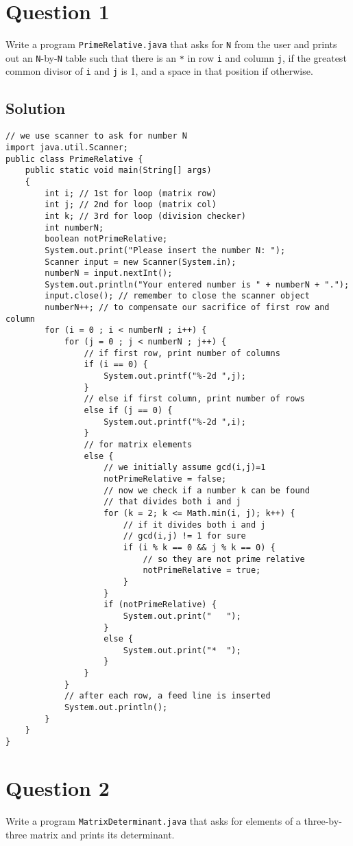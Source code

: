 \section*{Question 1}
Write a program \texttt{PrimeRelative.java} that asks for \texttt{N} from the user and prints out an \texttt{N}-by-\texttt{N} table such that there is an \texttt{*} in row \texttt{i} and column \texttt{j}, if the greatest common divisor of \texttt{i} and \texttt{j} is 1, and a space in that position if otherwise.

\subsection*{Solution}
\lstset{language=Java,tabsize=2}
\begin{lstlisting}
// we use scanner to ask for number N
import java.util.Scanner;
public class PrimeRelative {
	public static void main(String[] args) 
	{
		int i; // 1st for loop (matrix row)
		int j; // 2nd for loop (matrix col)
		int k; // 3rd for loop (division checker)
		int numberN;
		boolean notPrimeRelative;
		System.out.print("Please insert the number N: ");
		Scanner input = new Scanner(System.in);
		numberN = input.nextInt();
		System.out.println("Your entered number is " + numberN + ".");
		input.close(); // remember to close the scanner object
		numberN++; // to compensate our sacrifice of first row and column
		for (i = 0 ; i < numberN ; i++) {
			for (j = 0 ; j < numberN ; j++) {
				// if first row, print number of columns
				if (i == 0) {
					System.out.printf("%-2d ",j);
				}
				// else if first column, print number of rows
				else if (j == 0) {
					System.out.printf("%-2d ",i);
				}
				// for matrix elements
				else {
					// we initially assume gcd(i,j)=1
					notPrimeRelative = false;
					// now we check if a number k can be found
					// that divides both i and j
					for (k = 2; k <= Math.min(i, j); k++) {
						// if it divides both i and j
						// gcd(i,j) != 1 for sure
						if (i % k == 0 && j % k == 0) {
							// so they are not prime relative
							notPrimeRelative = true;
						}
					}
					if (notPrimeRelative) {
						System.out.print("   ");
					}
					else {
						System.out.print("*  ");
					}					
				}
			}
			// after each row, a feed line is inserted
			System.out.println();
		}
	}
}
\end{lstlisting}
\newpage
\section*{Question 2}
Write a program \texttt{MatrixDeterminant.java} that asks for elements of a three-by-three matrix and prints its determinant.

